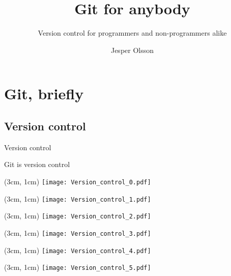 \documentclass{beamer}
\title{Git for anybody}
\subtitle{Version control for programmers and non-programmers alike}
\author{Jesper Olsson}
\institute{}
\begin{document}
\frame{\titlepage}

\section{Git, briefly}

\subsection{Version control}

\begin{frame}{Version control}
    \begin{center}
        \huge Git is version control
    \end{center}
\end{frame}

\begin{frame}
    \begin{textblock*}{\textwidth}(3cm, 1cm)
        \texttt{[image: Version\_control\_0.pdf]}
    \end{textblock*}
\end{frame}

\begin{frame}
    \begin{textblock*}{\textwidth}(3cm, 1cm)
        \texttt{[image: Version\_control\_1.pdf]}
    \end{textblock*}
\end{frame}

\begin{frame}
    \begin{textblock*}{\textwidth}(3cm, 1cm)
        \texttt{[image: Version\_control\_2.pdf]}
    \end{textblock*}
\end{frame}

\begin{frame}
    \begin{textblock*}{\textwidth}(3cm, 1cm)
        \texttt{[image: Version\_control\_3.pdf]}
    \end{textblock*}
\end{frame}

\begin{frame}
    \begin{textblock*}{\textwidth}(3cm, 1cm)
        \texttt{[image: Version\_control\_4.pdf]}
    \end{textblock*}
\end{frame}

\begin{frame}
    \begin{textblock*}{\textwidth}(3cm, 1cm)
        \texttt{[image: Version\_control\_5.pdf]}
    \end{textblock*}
\end{frame}
\end{document}
